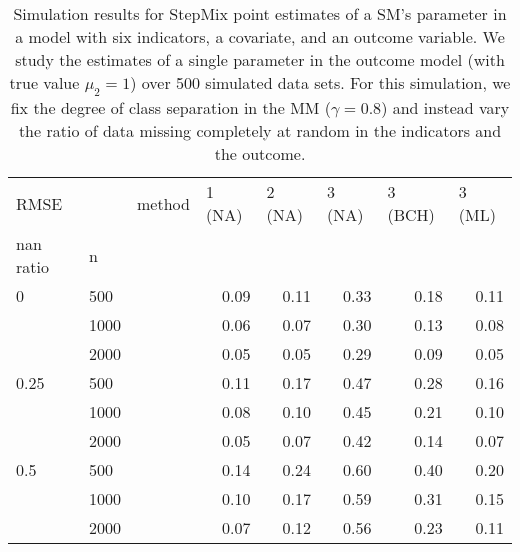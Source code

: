 \documentclass{article}
\begin{document}
\begin{table}[ht]
  \begin{tabular}{lll |rrrrr}
  \hline
RMSE           &      & method & \multicolumn{1}{l}{ 1 (NA)} & \multicolumn{1}{l}{ 2 (NA)} & \multicolumn{1}{l}{ 3 (NA)} & \multicolumn{1}{l}{ 3 (BCH)} & \multicolumn{1}{l}{ 3 (ML)} \\ 
  nan ratio & n    &        & \multicolumn{1}{l}{       } & \multicolumn{1}{l}{       } & \multicolumn{1}{l}{       } & \multicolumn{1}{l}{        } & \multicolumn{1}{l}{       } \\ 
   \hline
0         & 500  &        &   0.09 &   0.11 &   0.33 &    0.18 &   0.11 \\ 
            & 1000 &        &   0.06 &   0.07 &   0.30 &    0.13 &   0.08 \\ 
            & 2000 &        &   0.05 &   0.05 &   0.29 &    0.09 &   0.05 \\ 
  0.25      & 500  &        &   0.11 &   0.17 &   0.47 &    0.28 &   0.16 \\ 
            & 1000 &        &   0.08 &   0.10 &   0.45 &    0.21 &   0.10 \\ 
            & 2000 &        &   0.05 &   0.07 &   0.42 &    0.14 &   0.07 \\ 
  0.5       & 500  &        &   0.14 &   0.24 &   0.60 &    0.40 &   0.20 \\ 
            & 1000 &        &   0.10 &   0.17 &   0.59 &    0.31 &   0.15 \\ 
            & 2000 &        &   0.07 &   0.12 &   0.56 &    0.23 &   0.11 \\ 
   \hline
  \end{tabular}
  
\caption{Simulation results for StepMix point estimates of a SM's parameter in a model
with six indicators, a covariate, and an outcome variable. We study the estimates of a single
parameter in the outcome model (with true value $\mu_2 = 1$) over 500 simulated data sets. For
this simulation, we fix the degree of class separation in the MM ($\gamma = 0.8$) and instead vary
the ratio of data missing completely at random in the indicators and the outcome.}
\end{table}
\end{document}
